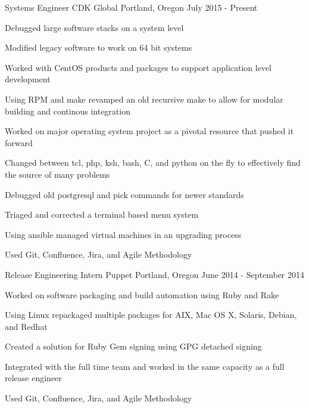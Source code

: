 

\begin{cventries}

  \cventry
    {Systems Engineer} %
    {CDK Global} %
    {Portland, Oregon} %
    {July 2015 - Present} %
    {
      \begin{cvitems} %
        \item {Debugged large software stacks on a system level}
        \item {Modified legacy software to work on 64 bit systems}
        \item {Worked with CentOS products and packages to support application level development}
        \item {Using RPM and make revamped an old recursive make to allow for modular building and continous integration}
        \item {Worked on major operating system project as a pivotal resource that pushed it forward}
        \item {Changed between tcl, php, ksh, bash, C, and python on the fly to effectively find the source of many problems}
        \item {Debugged old postgresql and pick commands for newer standards}
        \item {Triaged and corrected a terminal based menu system}
        \item {Using ansible managed virtual machines in an upgrading process}
        \item {Used Git, Confluence, Jira, and Agile Methodology}
      \end{cvitems}
    }

  \cventry
    {Release Engineering Intern} %
    {Puppet} %
    {Portland, Oregon} %
    {June 2014 - September 2014} %
    {
      \begin{cvitems} %
        \item {Worked on software packaging and build automation using Ruby and Rake}
        \item {Using Linux repackaged multiple packages for AIX, Mac OS X, Solaris, Debian, and Redhat}
        \item {Created a solution for Ruby Gem signing using GPG detached signing}
        \item {Integrated with the full time team and worked in the same capacity as a full release engineer}
        \item {Used Git, Confluence, Jira, and Agile Methodology}
      \end{cvitems}
    }


\end{cventries}
